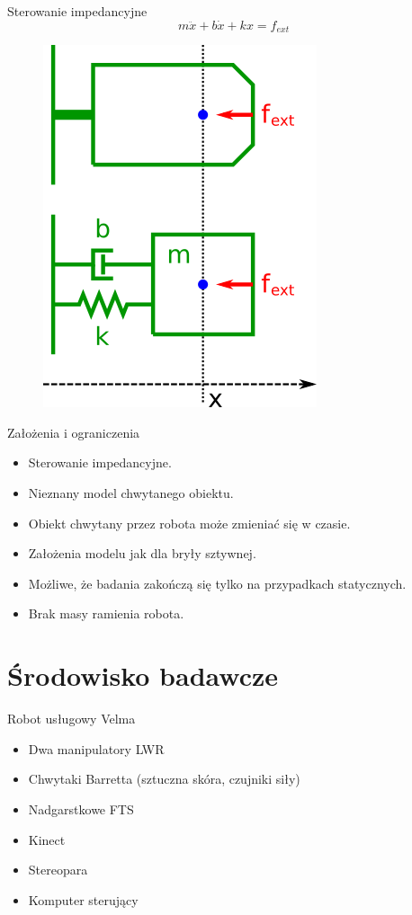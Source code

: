 \documentclass{beamer}
\begin{document}
\begin{frame}{Sterowanie impedancyjne}
\[ m\ddot{x} + b\dot{x} + kx = f_{ext} \]
\begin{figure}
	\centering
	\includegraphics[scale=1]{impedance}
\end{figure}
\end{frame}

\begin{frame}{Założenia i ograniczenia}
\begin{itemize}
	\item Sterowanie impedancyjne.
	\item Nieznany model chwytanego obiektu.
	\item Obiekt chwytany przez robota może zmieniać się w czasie.
	\item Założenia modelu jak dla bryły sztywnej.
	\item Możliwe, że badania zakończą się tylko na przypadkach statycznych.
	\item Brak masy ramienia robota.
\end{itemize}
\end{frame}

\section{Środowisko badawcze}

\begin{frame}{Robot usługowy Velma}
\begin{itemize}
\item Dwa manipulatory LWR
\item Chwytaki Barretta (sztuczna skóra, czujniki siły)
\item Nadgarstkowe FTS
\item Kinect
\item Stereopara
\item Komputer sterujący
\end{itemize}
\end{frame}
\end{document}
